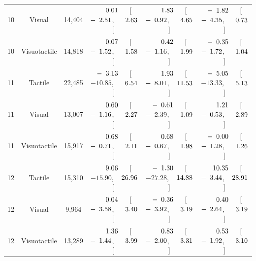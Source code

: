 \begin{table}[htbp]
{\begin{tabular}{lccccc}
10 & Visual & 14,404 & $\hphantom{-}\hphantom{0}0.01^{\hphantom{***}}$ [$-\hphantom{0}2.51$, $\hphantom{-}\hphantom{0}2.63$] & $\hphantom{-}\hphantom{0}1.83^{\hphantom{***}}$ [$-\hphantom{0}0.92$, $\hphantom{-}\hphantom{0}4.65$] & $-\hphantom{0}1.82^{\hphantom{***}}$ [$-\hphantom{0}4.35$, $\hphantom{-}\hphantom{0}0.73$] \\
10 & Visuotactile & 14,818 & $\hphantom{-}\hphantom{0}0.07^{\hphantom{***}}$ [$-\hphantom{0}1.52$, $\hphantom{-}\hphantom{0}1.58$] & $\hphantom{-}\hphantom{0}0.42^{\hphantom{***}}$ [$-\hphantom{0}1.16$, $\hphantom{-}\hphantom{0}1.99$] & $-\hphantom{0}0.35^{\hphantom{***}}$ [$-\hphantom{0}1.72$, $\hphantom{-}\hphantom{0}1.04$] \\
\midrule
11 & Tactile & 22,485 & $-\hphantom{0}3.13^{\hphantom{***}}$ [$-10.85$, $\hphantom{-}\hphantom{0}6.54$] & $\hphantom{-}\hphantom{0}1.93^{\hphantom{***}}$ [$-\hphantom{0}8.01$, $\hphantom{-}11.53$] & $-\hphantom{0}5.05^{\hphantom{***}}$ [$-13.33$, $\hphantom{-}\hphantom{0}5.13$] \\
11 & Visual & 13,007 & $\hphantom{-}\hphantom{0}0.60^{\hphantom{***}}$ [$-\hphantom{0}1.16$, $\hphantom{-}\hphantom{0}2.27$] & $-\hphantom{0}0.61^{\hphantom{***}}$ [$-\hphantom{0}2.39$, $\hphantom{-}\hphantom{0}1.09$] & $\hphantom{-}\hphantom{0}1.21^{\hphantom{***}}$ [$-\hphantom{0}0.53$, $\hphantom{-}\hphantom{0}2.89$] \\
11 & Visuotactile & 15,917 & $\hphantom{-}\hphantom{0}0.68^{\hphantom{***}}$ [$-\hphantom{0}0.71$, $\hphantom{-}\hphantom{0}2.11$] & $\hphantom{-}\hphantom{0}0.68^{\hphantom{***}}$ [$-\hphantom{0}0.67$, $\hphantom{-}\hphantom{0}1.98$] & $-\hphantom{0}0.00^{\hphantom{***}}$ [$-\hphantom{0}1.28$, $\hphantom{-}\hphantom{0}1.26$] \\
\midrule
12 & Tactile & 15,310 & $\hphantom{-}\hphantom{0}9.06^{\hphantom{***}}$ [$-15.90$, $\hphantom{-}26.96$] & $-\hphantom{0}1.30^{\hphantom{***}}$ [$-27.28$, $\hphantom{-}14.88$] & $\hphantom{-}10.35^{\hphantom{***}}$ [$-\hphantom{0}3.44$, $\hphantom{-}28.91$] \\
12 & Visual & 9,964 & $\hphantom{-}\hphantom{0}0.04^{\hphantom{***}}$ [$-\hphantom{0}3.58$, $\hphantom{-}\hphantom{0}3.40$] & $-\hphantom{0}0.36^{\hphantom{***}}$ [$-\hphantom{0}3.92$, $\hphantom{-}\hphantom{0}3.19$] & $\hphantom{-}\hphantom{0}0.40^{\hphantom{***}}$ [$-\hphantom{0}2.64$, $\hphantom{-}\hphantom{0}3.19$] \\
12 & Visuotactile & 13,289 & $\hphantom{-}\hphantom{0}1.36^{\hphantom{***}}$ [$-\hphantom{0}1.44$, $\hphantom{-}\hphantom{0}3.99$] & $\hphantom{-}\hphantom{0}0.83^{\hphantom{***}}$ [$-\hphantom{0}2.00$, $\hphantom{-}\hphantom{0}3.31$] & $\hphantom{-}\hphantom{0}0.53^{\hphantom{***}}$ [$-\hphantom{0}1.92$, $\hphantom{-}\hphantom{0}3.10$] \\

\end{tabular}}
\end{table}
